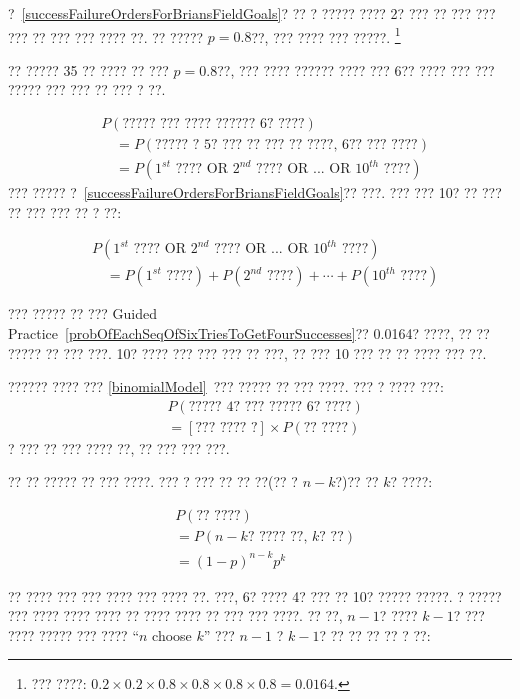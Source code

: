 \begin{exercise} \label{probOfEachSeqOfSixTriesToGetFourSuccesses}
?~\ref{successFailureOrdersForBriansFieldGoals}? ?? ? ????? ???? 2? ??? ?? ??? ??? ??? ?? ??? ??? ???? ??. ?? ????? $p=0.8$??, ??? ???? ??? ?????.
\footnote{??? ????: $0.2\times0.2\times0.8\times0.8\times0.8\times0.8 = 0.0164$.}
\end{exercise}

?? ????? 35 ?? ???? ?? ??? $p=0.8$??, ??? ???? ?????? ???? ??? 6?? ???? ??? ??? ????? ??? ??? ?? ??? ? ??.

{\small\begin{align*}
&P(\text{????? ??? ???? ?????? 6? ????}) \\
& \quad = P(\text{????? ? 5? ??? ?? ??? ?? ????, 6?? ??? ????}) \\
& \quad = P(\text{$1^{st}$ ???? OR $2^{nd}$ ???? OR ... OR $10^{th}$ ????})
\end{align*}
}
??? ????? ?~\ref{successFailureOrdersForBriansFieldGoals}?? ???. ??? ??? 10? ?? ??? ?? ??? ??? ?? ? ??:

{\small\begin{align*}
&P(\text{$1^{st}$ ???? OR $2^{nd}$ ???? OR ... OR $10^{th}$ ????}) \\
&\quad = P(\text{$1^{st}$ ????}) + P(\text{$2^{nd}$ ????}) + \cdots + P(\text{$10^{th}$ ????})
\end{align*}
}

??? ????? ?? ??? Guided Practice~\ref{probOfEachSeqOfSixTriesToGetFourSuccesses}?? 0.0164? ????, ?? ?? ????? ?? ??? ???. 10? ???? ??? ??? ??? ?? ???, ?? ??? 10 ??? ?? ?? ???? ??? ??.

?????? ???? ??? \ref{binomialModel}~??? ????? ?? ??? ????. ??? ? ???? ???:
\begin{align*}
&P(\text{????? 4? ??? ????? 6? ????}) \\
&= [\text{??? ???? ?}] \times P(\text{?? ????})
\end{align*}
? ??? ?? ??? ???? ??, ?? ??? ??? ???.

?? ?? ????? ?? ??? ????. ??? ? ??? ?? ?? ??(?? ? $n-k$?)?? ?? $k$? ????:

\begin{align*}
&P(\text{?? ????}) \\
&= P(\text{$n-k$? ???? ??, $k$? ??}) \\
&= (1-p)^{n-k} p^{k}
\end{align*}

?? ???? ??? ??? ???? ??? ???? ??. ???, 6? ???? 4? ??? ?? 10? ????? ?????. ? ????? ??? ???? ???? ???? ?? ???? ???? ?? ??? ??? ????. ?? ??, $n-1$? ???? $k-1$? ??? ???? ????? ??? ???? ``$n$ choose $k$'' ???  $n-1$ ? $k-1$? ?? ?? ?? ?? ? ??:

